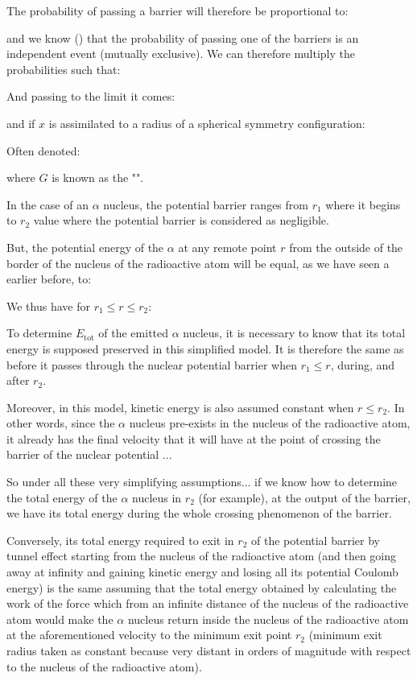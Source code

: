 	The probability of passing a barrier will therefore be proportional to:
	
	and we know () that the probability of passing one of the barriers is an independent event (mutually exclusive). We can therefore multiply the probabilities such that:
	
	And passing to the limit it comes:
	
	and if $x$ is assimilated to a radius of a spherical symmetry configuration:
	
	Often denoted:
	
	where $G$ is known as the "\label{Gamow factor}".
	
	In the case of an $\alpha$ nucleus, the potential barrier ranges from $r_1$ where it begins to $r_2$ value where the potential barrier is considered as negligible.

	But, the potential energy of the $\alpha$ at any remote point $r$ from the outside of the border of the nucleus of the radioactive atom will be equal, as we have seen a earlier before, to:
	
	We thus have for $r_1\leq r \leq r_2$:
	
	To determine $E_\text{tot}$ of the emitted $\alpha$ nucleus, it is necessary to know that its total energy is supposed preserved in this simplified model. It is therefore the same as before it passes through the nuclear potential barrier when $r_1\leq r$, during, and after $r_2$.

	Moreover, in this model, kinetic energy is also assumed constant when $r\leq r_2$. In other words, since the $\alpha$ nucleus pre-exists in the nucleus of the radioactive atom, it already has the final velocity that it will have at the point of crossing the barrier of the nuclear potential ...

	So under all these very simplifying assumptions... if we know how to determine the total energy of the $\alpha$ nucleus in $r_2$ (for example), at the output of the barrier, we have its total energy during the whole crossing phenomenon of the barrier.

	Conversely, its total energy required to exit in $r_2$ of the potential barrier by tunnel effect starting from the nucleus of the radioactive atom (and then going away at infinity and gaining kinetic energy and losing all its potential Coulomb energy) is the same assuming that the total energy obtained by calculating the work of the force which from an infinite distance of the nucleus of the radioactive atom would make the $\alpha$ nucleus return inside the nucleus of the radioactive atom at the aforementioned velocity to the minimum exit point $r_2$ (minimum exit radius taken as constant because very distant in orders of magnitude with respect to the nucleus of the radioactive atom).

